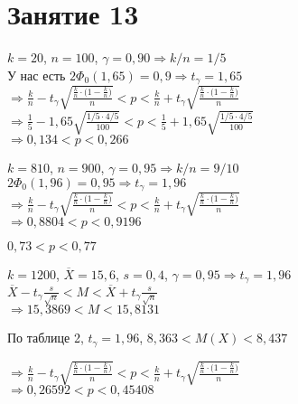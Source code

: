 \section*{Занятие 13}

\begin{exercise}[1]
	$k=20$, $n=100$, $\gamma=0,90 \Rightarrow k/n = 1/5$ \\ У нас есть $2\Phi_0(1,65)=0,9 \Rightarrow t_\gamma=1,65$ \\ $\Rightarrow \frac{k}{n} - t_\gamma \sqrt{\frac{\frac{k}{n} \cdot \Big(1-\frac{k}{n}\Big)}{n}} < p < \frac{k}{n} + t_\gamma \sqrt{\frac{\frac{k}{n} \cdot \Big(1-\frac{k}{n}\Big)}{n}}$ \\ $\Rightarrow \frac{1}{5} - 1,65 \sqrt{\frac{1/5 \cdot 4/5}{100}} < p < \frac{1}{5} + 1,65 \sqrt{\frac{1/5 \cdot 4/5}{100}}$ \\ $\Rightarrow 0,134 < p < 0,266$
\end{exercise}

\begin{exercise}[2]
	$k=810$, $n=900$, $\gamma=0,95 \Rightarrow k/n = 9/10$ \\ $2\Phi_0(1,96)=0,95 \Rightarrow t_\gamma = 1,96$ \\ $\Rightarrow \frac{k}{n} - t_\gamma \sqrt{\frac{\frac{k}{n} \cdot \Big(1-\frac{k}{n}\Big)}{n}} < p < \frac{k}{n} + t_\gamma \sqrt{\frac{\frac{k}{n} \cdot \Big(1-\frac{k}{n}\Big)}{n}}$ \\ $\Rightarrow 0,8804 < p < 0,9196$
\end{exercise}

\begin{exercise}[3]
	$0,73 < p < 0,77$
\end{exercise}

\begin{exercise}[4]
	$k=1200$, $\overline{X} = 15,6$, $s=0,4$, $\gamma=0,95 \Rightarrow t_\gamma=1,96$ \\ $\overline{X} - t_\gamma \frac{s}{\sqrt{n}} < M < \overline{X} + t_\gamma \frac{s}{\sqrt{n}}$ \\ $\Rightarrow 15,3869 < M < 15,8131$
\end{exercise}

\begin{exercise}[5]
	По таблице 2, $t_\gamma = 1,96$, $8,363 < M(X) < 8,437$
\end{exercise}

\begin{exercise}[6]
	$\Rightarrow \frac{k}{n} - t_\gamma \sqrt{\frac{\frac{k}{n} \cdot \Big(1-\frac{k}{n}\Big)}{n}} < p < \frac{k}{n} + t_\gamma \sqrt{\frac{\frac{k}{n} \cdot \Big(1-\frac{k}{n}\Big)}{n}}$ \\ $\Rightarrow 0,26592 < p < 0,45408$
\end{exercise}